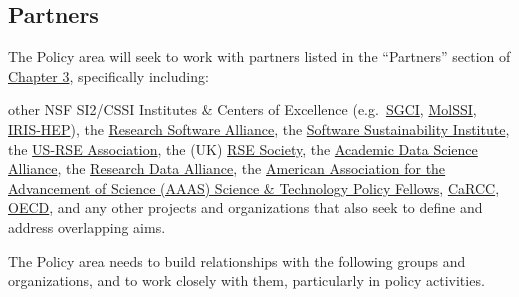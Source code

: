 \documentclass[
]{book}
\begin{document}
\hypertarget{partners-1}{%
\subsection{Partners}\label{partners-1}}

The Policy area will seek to work with partners listed in the ``Partners'' section of \protect\hyperlink{chapter3}{Chapter 3}, specifically including:

other NSF SI2/CSSI Institutes \& Centers of Excellence
(e.g.~\href{https://sciencegateways.org}{SGCI}, \href{https://molssi.org}{MolSSI}, \href{https://iris-hep.org}{IRIS-HEP}),
the \href{https://www.researchsoft.org}{Research Software Alliance},
the \href{https://software.ac.uk}{Software Sustainability Institute},
the \href{https://us-rse.org}{US-RSE Association},
the (UK) \href{https://society-rse.org}{RSE Society},
the \href{https://www.academicdatascience.org}{Academic Data Science Alliance},
the \href{https://www.rd-alliance.org}{Research Data Alliance},
the \href{https://www.aaas.org/programs/science-technology-policy-fellowships}{American Association for the Advancement of Science (AAAS) Science \& Technology Policy Fellows},
\href{https://carcc.org}{CaRCC},
\href{http://www.oecd.org}{OECD},
and any other projects and organizations that also seek to define and address overlapping aims.

The Policy area needs to build relationships with the following groups and organizations, and
to work closely with them, particularly in policy activities.
\end{document}

